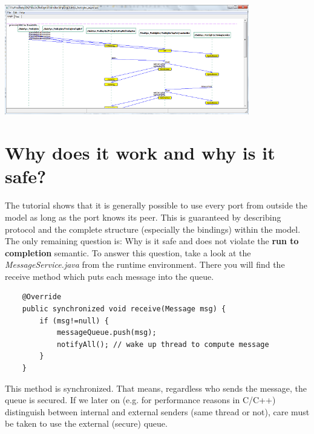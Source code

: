 \includegraphics[width=0.8\textwidth]{images/030-PedLights04.png}

\section{Why does it work and why is it safe?}

The tutorial shows that it is generally possible to use every port from outside the model as long as the 
port knows its peer. This is guaranteed by describing protocol and the complete structure (especially the 
bindings) within the model. 
The only remaining question is: Why is it safe and does not violate the \textbf{run to completion} 
semantic. To answer this question, take a look at the \textit{MessageService.java} from the runtime 
environment. There you will find the receive method which puts each message into the queue. 

\begin{verbatim}
    @Override
    public synchronized void receive(Message msg) {
        if (msg!=null) {
            messageQueue.push(msg);
            notifyAll(); // wake up thread to compute message
        }
    }
\end{verbatim}

This method is synchronized. That means, regardless who sends the message, the queue is secured. If we 
later on (e.g. for performance reasons in C/C++) distinguish between internal and external senders (same 
thread or not), care must be taken to use the external (secure) queue.
